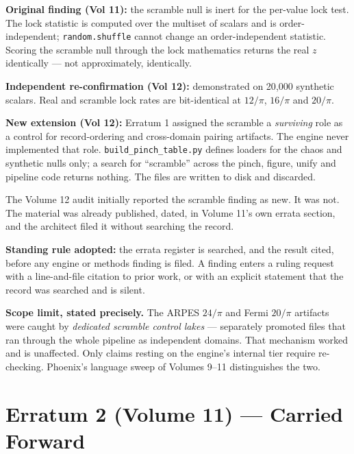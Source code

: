 \documentclass[11pt, letterpaper, openany]{book}
\begin{document}
\begin{erratumbox}
\textbf{Original finding (Vol 11):} the scramble null is inert for the per-value lock test.
The lock statistic is computed over the multiset of scalars and is order-independent;
\texttt{random.shuffle} cannot change an order-independent statistic. Scoring the scramble null
through the lock mathematics returns the real $z$ identically --- not approximately, identically.

\medskip
\textbf{Independent re-confirmation (Vol 12):} demonstrated on 20{,}000 synthetic scalars. Real
and scramble lock rates are bit-identical at $12/\pi$, $16/\pi$ and $20/\pi$.

\medskip
\textbf{New extension (Vol 12):} Erratum 1 assigned the scramble a \emph{surviving} role as a
control for record-ordering and cross-domain pairing artifacts. The engine never implemented
that role. \texttt{build\_pinch\_table.py} defines loaders for the chaos and synthetic nulls
only; a search for ``scramble'' across the pinch, figure, unify and pipeline code returns
nothing. The files are written to disk and discarded.
\end{erratumbox}

\begin{correctionbox}
The Volume 12 audit initially reported the scramble finding as new. It was not. The material was
already published, dated, in Volume 11's own errata section, and the architect filed it without
searching the record.

\medskip
\noindent \textbf{Standing rule adopted:} the errata register is searched, and the result cited,
before any engine or methods finding is filed. A finding enters a ruling request with a
line-and-file citation to prior work, or with an explicit statement that the record was searched
and is silent.
\end{correctionbox}

\textbf{Scope limit, stated precisely.} The ARPES $24/\pi$ and Fermi $20/\pi$ artifacts were
caught by \emph{dedicated scramble control lakes} --- separately promoted files that ran through
the whole pipeline as independent domains. That mechanism worked and is unaffected. Only claims
resting on the engine's internal tier require re-checking. Phoenix's language sweep of Volumes
9--11 distinguishes the two.

\section{Erratum 2 (Volume 11) --- Carried Forward}
\end{document}
